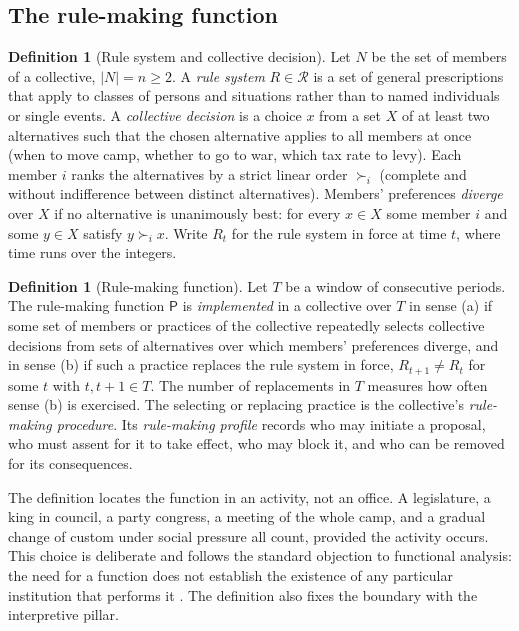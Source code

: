 \documentclass[11pt,letterpaper]{article}
\theoremstyle{definition}
\newtheorem{definition}[theorem]{Definition}
\theoremstyle{remark}
\newcommand{\pP}{\mathsf{P}}
\newcommand{\Rules}{\mathcal{R}}
\begin{document}
\subsection{The rule-making function}

\begin{definition}[Rule system and collective decision]
\label{def:political-power:rule-system}
Let $N$ be the set of members of a collective, $|N|=n\ge 2$. A \emph{rule system} $R\in\Rules$ is a set of general prescriptions that apply to classes of persons and situations rather than to named individuals or single events. A \emph{collective decision} is a choice $x$ from a set $X$ of at least two alternatives such that the chosen alternative applies to all members at once (when to move camp, whether to go to war, which tax rate to levy). Each member $i$ ranks the alternatives by a strict linear order $\succ_i$ (complete and without indifference between distinct alternatives). Members' preferences \emph{diverge} over $X$ if no alternative is unanimously best: for every $x\in X$ some member $i$ and some $y\in X$ satisfy $y\succ_i x$. Write $R_t$ for the rule system in force at time $t$, where time runs over the integers.
\end{definition}

\begin{definition}[Rule-making function]
\label{def:political-power:rule-making}
Let $T$ be a window of consecutive periods. The rule-making function $\pP$ is \emph{implemented} in a collective over $T$ in sense (a) if some set of members or practices of the collective repeatedly selects collective decisions from sets of alternatives over which members' preferences diverge, and in sense (b) if such a practice replaces the rule system in force, $R_{t+1}\neq R_t$ for some $t$ with $t,t+1\in T$. The number of replacements in $T$ measures how often sense (b) is exercised. The selecting or replacing practice is the collective's \emph{rule-making procedure}. Its \emph{rule-making profile} records who may initiate a proposal, who must assent for it to take effect, who may block it, and who can be removed for its consequences.
\end{definition}

The definition locates the function in an activity, not an office. A legislature, a king in council, a party congress, a meeting of the whole camp, and a gradual change of custom under social pressure all count, provided the activity occurs. This choice is deliberate and follows the standard objection to functional analysis: the need for a function does not establish the existence of any particular institution that performs it \citep{hempel1959,merton1968}. The definition also fixes the boundary with the interpretive pillar.
\end{document}
